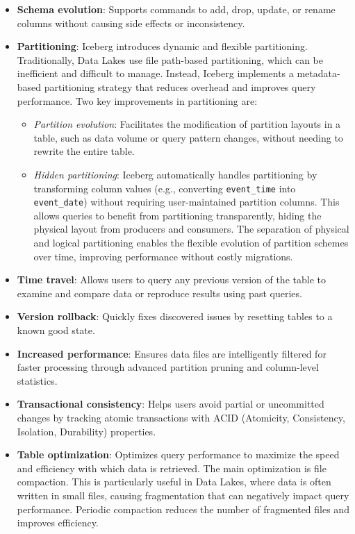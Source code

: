 \begin{itemize}
    \item \textbf{Schema evolution}: Supports commands to add, drop, update, or rename columns without causing side effects or inconsistency.
    \item \textbf{Partitioning}: Iceberg introduces dynamic and flexible partitioning. Traditionally, Data Lakes use file path-based partitioning, which can be inefficient and difficult to manage. Instead, Iceberg implements a metadata-based partitioning strategy that reduces overhead and improves query performance. Two key improvements in partitioning are:
    \begin{itemize}
        \item \textit{Partition evolution}: Facilitates the modification of partition layouts in a table, such as data volume or query pattern changes, without needing to rewrite the entire table.
        \item \textit{Hidden partitioning}: Iceberg automatically handles partitioning by transforming column values (e.g., converting \texttt{event\_time} into \texttt{event\_date}) without requiring user-maintained partition columns. This allows queries to benefit from partitioning transparently, hiding the physical layout from producers and consumers. The separation of physical and logical partitioning enables the flexible evolution of partition schemes over time, improving performance without costly migrations.
    \end{itemize}
    \item \textbf{Time travel}: Allows users to query any previous version of the table to examine and compare data or reproduce results using past queries.
    \item \textbf{Version rollback}: Quickly fixes discovered issues by resetting tables to a known good state.
    \item \textbf{Increased performance}: Ensures data files are intelligently filtered for faster processing through advanced partition pruning and column-level statistics.
    \item \textbf{Transactional consistency}: Helps users avoid partial or uncommitted changes by tracking atomic transactions with \acs{ACID} (Atomicity, Consistency, Isolation, Durability) properties.
    \item \textbf{Table optimization}: Optimizes query performance to maximize the speed and efficiency with which data is retrieved. The main optimization is file compaction. This is particularly useful in Data Lakes, where data is often written in small files, causing fragmentation that can negatively impact query performance. Periodic compaction reduces the number of fragmented files and improves efficiency.
\end{itemize}

